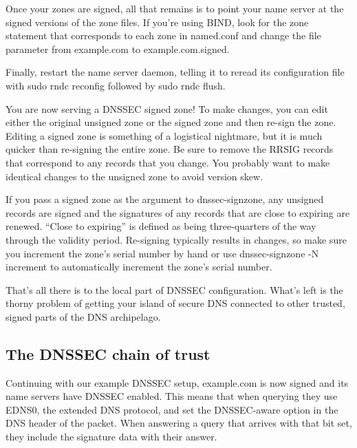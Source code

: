 Once your zones are signed, all that remains is to point your name
server at the signed versions of the zone files. If you're using BIND,
look for the {zone} statement that corresponds to each zone in
{named.conf} and change the {file} parameter from {example.com} to
{example.com.signed}.

Finally, restart the name server daemon, telling it to reread its
configuration file with {sudo rndc reconfig} followed by {sudo rndc
flush}.

You are now serving a DNSSEC signed zone! To make changes, you can edit
either the original unsigned zone or the signed zone and then re-sign
the zone. Editing a signed zone is something of a logistical nightmare,
but it is much quicker than re-signing the entire zone. Be sure to
remove the RRSIG records that correspond to any records that you change.
You probably want to make identical changes to the unsigned zone to
avoid version skew.

If you pass a signed zone as the argument to {dnssec-signzone}, any
unsigned records are signed and the signatures of any records that are
close to expiring are renewed. ``Close to expiring'' is defined as being
three-quarters of the way through the validity period. Re-signing
typically results in changes, so make sure you increment the zone's
serial number by hand or use {dnssec-signzone -N increment} to
automatically increment the zone's serial number.

That's all there is to the local part of DNSSEC configuration. What's
left is the thorny problem of getting your island of secure DNS
connected to other trusted, signed parts of the DNS archipelago.

\protect\hypertarget{part0024_split_065.html}{}{}

\hypertarget{part0024_split_065.htmlux5cux23_idContainer1069}{}
\hypertarget{part0024_split_065.htmlux5cux23calibre_pb_64}{%
\subsection[The DNSSEC chain of
trust]{\texorpdfstring{\protect\hypertarget{part0024_split_065.htmlux5cux23_idTextAnchor945}{}{}The
DNSSEC chain of
trust}{The DNSSEC chain of trust}}\label{part0024_split_065.htmlux5cux23calibre_pb_64}}

\protect\hypertarget{part0024_split_065.htmlux5cux23_idIndexMarker2268}{}{}\protect\hypertarget{part0024_split_065.htmlux5cux23_idIndexMarker2269}{}{}Continuing
with our example DNSSEC setup, example.com is now signed and its name
servers have DNSSEC enabled. This means that when querying they use
EDNS0, the extended DNS protocol, and set the DNSSEC-aware option in the
DNS header of the packet. When answering a query that arrives with that
bit set, they include the signature data with their answer.

